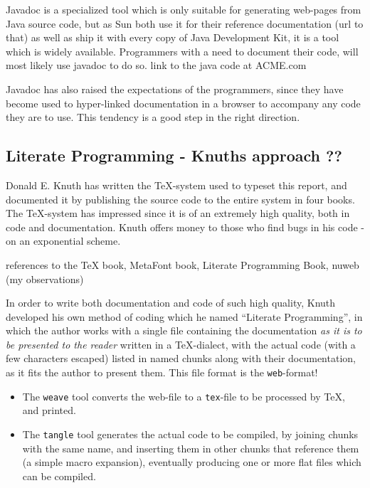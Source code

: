 Javadoc is a specialized tool which is only suitable for generating
web-pages from Java source code, but as Sun both use it for their
reference documentation (\textsf{url to that}) as well as ship it with
every copy of Java Development Kit, it is a tool which is widely
available.  Programmers with a need to document their code, will most
likely use javadoc to do so.  \textsf{link to the java code at
ACME.com}

Javadoc has also raised the expectations of the programmers, since
they have become used to hyper-linked documentation in a browser to
accompany any code they are to use.  This tendency is a good step in
the right direction.

\subsection{Literate Programming - Knuths approach \textsf{??}}
\label{sec:literate-programming}

Donald E. Knuth has written the {\TeX}-system used to typeset this
report, and documented it by publishing the source code to the entire
system in four books.  The {\TeX}-system has impressed since it is of
an extremely high quality, both in code and documentation.
\textsf{Knuth offers money to those who find bugs in his code - on an
  exponential scheme}.

\textsf{references to the TeX book, MetaFont book, Literate
  Programming Book, nuweb (my observations)}

In order to write both documentation and code of such high quality,
Knuth developed his own method of coding \textsf{which he named
``Literate Programming''}, in which the author works with a single
file containing the documentation \textit{as it is to be presented to
the reader} written in a {\TeX}-dialect, with the actual code (with a
few characters escaped) listed in named chunks along with their
documentation, as it fits the author to present them.  This file
format is the \texttt{web}-format!

\begin{itemize}
\item 
The \texttt{weave} tool converts the web-file to a \texttt{tex}-file
to be processed by {\TeX}, and printed.

\item The \texttt{tangle} tool generates the actual code to be
compiled, by joining chunks with the same name, and inserting them in
other chunks that reference them (a simple macro expansion),
eventually producing one or more flat files which can be compiled.

\end{itemize}


